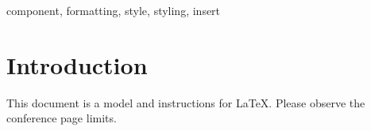 \documentclass[10pt,conference]{IEEEtran}
\begin{document}
\begin{IEEEkeywords}
component, formatting, style, styling, insert
\end{IEEEkeywords}

\section{Introduction}
This document is a model and instructions for \LaTeX.
Please observe the conference page limits. 







\appendix
\end{document}
